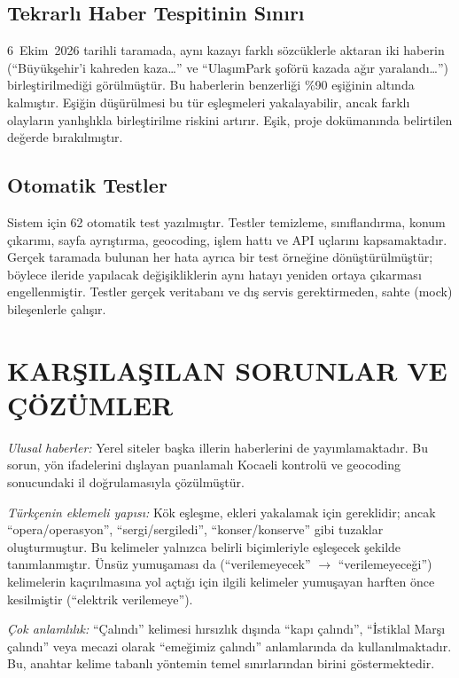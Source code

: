 \documentclass[conference,a4paper]{IEEEtran}
\begin{document}
\subsection{Tekrarlı Haber Tespitinin Sınırı}
6~Ekim~2026 tarihli taramada, aynı kazayı farklı sözcüklerle aktaran iki haberin
(``Büyükşehir'i kahreden kaza\ldots'' ve ``UlaşımPark şoförü kazada ağır
yaralandı\ldots'') birleştirilmediği görülmüştür. Bu haberlerin benzerliği \%90
eşiğinin altında kalmıştır. Eşiğin düşürülmesi bu tür eşleşmeleri yakalayabilir,
ancak farklı olayların yanlışlıkla birleştirilme riskini artırır. Eşik, proje
dokümanında belirtilen değerde bırakılmıştır.

\subsection{Otomatik Testler}
Sistem için 62 otomatik test yazılmıştır. Testler temizleme, sınıflandırma,
konum çıkarımı, sayfa ayrıştırma, geocoding, işlem hattı ve API uçlarını
kapsamaktadır. Gerçek taramada bulunan her hata ayrıca bir test
örneğine dönüştürülmüştür; böylece ileride yapılacak değişikliklerin aynı hatayı
yeniden ortaya çıkarması engellenmiştir. Testler gerçek veritabanı ve dış servis gerektirmeden,
sahte (mock) bileşenlerle çalışır.

\section{KARŞILAŞILAN SORUNLAR VE ÇÖZÜMLER}\label{sec:sorunlar}
\emph{Ulusal haberler:} Yerel siteler başka illerin haberlerini de
yayımlamaktadır. Bu sorun, yön ifadelerini dışlayan puanlamalı Kocaeli kontrolü
ve geocoding sonucundaki il doğrulamasıyla çözülmüştür.

\emph{Türkçenin eklemeli yapısı:} Kök eşleşme, ekleri yakalamak için gereklidir;
ancak ``opera/operasyon'', ``sergi/sergiledi'', ``konser/konserve'' gibi
tuzaklar oluşturmuştur. Bu kelimeler yalnızca belirli biçimleriyle eşleşecek
şekilde tanımlanmıştır. Ünsüz yumuşaması da (``verilemeyecek'' $\rightarrow$
``verilemeyeceği'') kelimelerin kaçırılmasına yol açtığı için ilgili kelimeler
yumuşayan harften önce kesilmiştir (``elektrik verilemeye'').

\emph{Çok anlamlılık:} ``Çalındı'' kelimesi hırsızlık dışında ``kapı çalındı'',
``İstiklal Marşı çalındı'' veya mecazi olarak ``emeğimiz çalındı'' anlamlarında da
kullanılmaktadır. Bu, anahtar kelime tabanlı yöntemin temel sınırlarından birini
göstermektedir.
\end{document}
